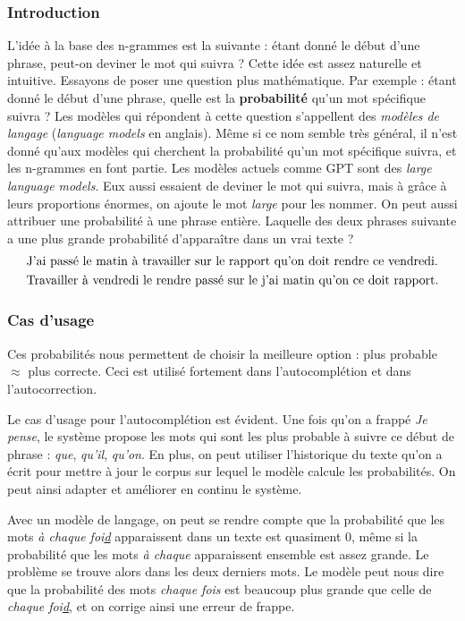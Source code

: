 \documentclass[11pt, a4paper]{report}
\begin{document}
  \subsubsection{Introduction}
  L'idée à la base des n-grammes est la suivante : étant donné le début d'une phrase, peut-on 
  deviner le mot qui suivra ? Cette idée est assez naturelle et intuitive. Essayons de poser 
  une question plus mathématique. Par exemple : étant donné le début d'une phrase, quelle est la \textbf{probabilité}
  qu'un mot spécifique suivra ? Les modèles qui répondent à cette question s'appellent des 
  \textit{modèles de langage} (\textit{language models} en anglais). Même si ce nom semble 
  très général, il n'est donné qu'aux modèles qui cherchent la probabilité qu'un mot spécifique 
  suivra, et les n-grammes en font partie. Les modèles actuels comme GPT sont des \textit{large language models}. Eux aussi essaient 
  de deviner le mot qui suivra, mais à grâce à leurs proportions énormes, on ajoute le mot 
  \textit{large} pour les nommer. On peut aussi attribuer une probabilité à une phrase 
  entière. Laquelle des deux phrases suivante a une plus grande probabilité d'apparaître 
  dans un vrai texte ? 
  \begin{align*}
    &\textup{J'ai passé le matin à travailler sur le rapport qu'on doit rendre ce vendredi.} \\
    &\textup{Travailler à vendredi le rendre passé sur le j'ai matin qu'on ce doit rapport.}
  \end{align*}
  
  \subsubsection{Cas d'usage}
  Ces probabilités nous permettent de choisir la meilleure option : plus probable $\approx$ plus 
  correcte. Ceci est utilisé fortement dans l'autocomplétion et dans l'autocorrection. 

  Le cas d'usage pour l'autocomplétion est évident. Une fois qu'on a frappé \textit{Je pense}, 
  le système propose les mots qui sont les plus probable à suivre ce début de phrase : 
  \textit{que}, \textit{qu'il}, \textit{qu'on}. En plus, on peut utiliser l'historique du 
  texte qu'on a écrit pour mettre à jour le corpus sur lequel le modèle calcule les 
  probabilités. On peut ainsi adapter et améliorer en continu le système.  
  
  Avec un modèle 
  de langage, on peut se rendre compte que la probabilité que les mots \textit{à chaque foi\underline{d}}
  apparaissent dans un texte est quasiment 0, même si la probabilité que les mots \textit{à chaque} 
  apparaissent ensemble est assez grande. Le problème se trouve alors dans les deux derniers mots. 
  Le modèle peut nous dire que la probabilité des mots \textit{chaque fois} est beaucoup plus grande 
  que celle de \textit{chaque foi\underline{d}}, et on corrige ainsi une erreur de frappe. 
\end{document}
